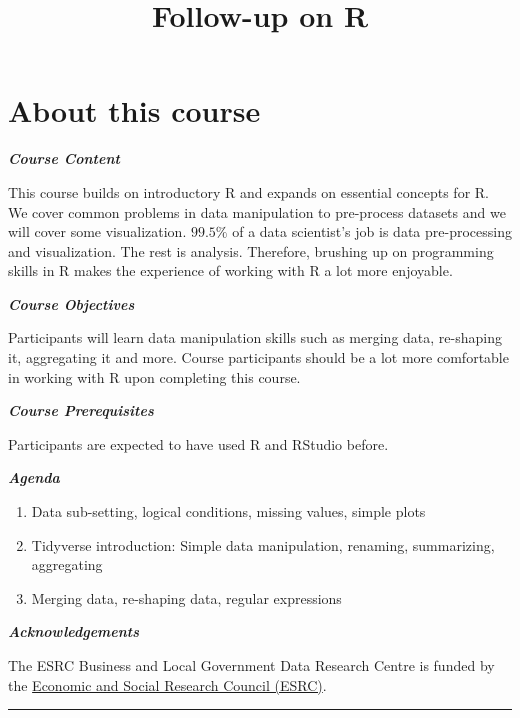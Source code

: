 \documentclass[]{article}
\title{Follow-up on R}
\author{}
\date{}
\providecommand{\tightlist}{%
  \setlength{\itemsep}{0pt}\setlength{\parskip}{0pt}}
\begin{document}
\maketitle

{
\setcounter{tocdepth}{2}
\tableofcontents
}
\hypertarget{about-this-course}{%
\section*{About this course}\label{about-this-course}}

\textbf{\emph{Course Content}}

This course builds on introductory R and expands on essential concepts for R. We cover common problems in data manipulation to pre-process datasets and we will cover some visualization. \(99.5\%\) of a data scientist's job is data pre-processing and visualization. The rest is analysis. Therefore, brushing up on programming skills in R makes the experience of working with R a lot more enjoyable.

\textbf{\emph{Course Objectives}}

Participants will learn data manipulation skills such as merging data, re-shaping it, aggregating it and more. Course participants should be a lot more comfortable in working with R upon completing this course.

\textbf{\emph{Course Prerequisites}}

Participants are expected to have used R and RStudio before.

\textbf{\emph{Agenda}}

\begin{enumerate}
\def\labelenumi{\arabic{enumi}.}
\tightlist
\item
  Data sub-setting, logical conditions, missing values, simple plots
\item
  Tidyverse introduction: Simple data manipulation, renaming, summarizing, aggregating
\item
  Merging data, re-shaping data, regular expressions
\end{enumerate}

\textbf{\emph{Acknowledgements}}

The ESRC Business and Local Government Data Research Centre is funded by the \href{https://esrc.ukri.org}{Economic and Social Research Council (ESRC)}.

\begin{center}\rule{0.5\linewidth}{\linethickness}\end{center}
\end{document}
